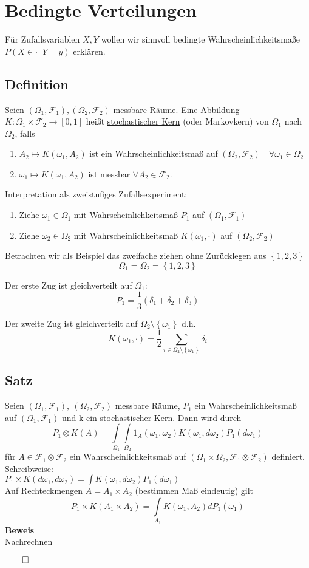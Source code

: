 \documentclass[german,10pt,oneside, fleqn, a4paper]{article}
\newcommand{\ra}{\rightarrow}
\newcommand{\sm}[2][\infty]{\sum\limits_{#2}^{#1}}
\newcommand{\brac}[1]{\left\lbrace #1\right\rbrace}
\newcommand{\QED}{\begin{flushright}$\qed$\end{flushright}}
\newcommand{\mc}[1]{\mathcal{#1}}
\newcommand{\beweis}{\textbf{Beweis}\\}
\newcommand{\1}[1]{1_{#1}}
\newcommand{\2}[1]{\1{\brac{#1}}}
\newcommand{\f}{\mc{F}}
\newcommand{\qf}{\quad\forall}
\begin{document}
\pagebreak
\section{Bedingte Verteilungen}
Für Zufallsvariablen $X,Y$ wollen wir sinnvoll bedingte Wahrscheinlichkeitsmaße $P(X\in\cdot\;|Y=y)$ erklären.

\subsection{Definition}
\label{7.1}
Seien $(\Omega_1,\f_1),(\Omega_2,\f_2)$ messbare Räume. Eine Abbildung\\
$K:\Omega_1\times\f_2\ra [0,1]$ heißt \underline{stochastischer Kern} (oder Markovkern) von $\Omega_1$ nach $\Omega_2$, falls\begin{enumerate}[label=(\roman*)]
\item $A_2\mapsto K(\omega_1,A_2)$ ist ein Wahrscheinlichkeitsmaß auf $(\Omega_2,\f_2)\qf\omega_1\in\Omega_2$
\item $\omega_1\mapsto K(\omega_1,A_2)$ ist messbar $\forall A_2\in\f_2$.
\end{enumerate}
Interpretation als zweistufiges Zufallsexperiment:\begin{enumerate}
\item Ziehe $\omega_1\in\Omega_1$ mit Wahrscheinlichkeitsmaß $P_1$ auf $(\Omega_1,\f_1)$
\item Ziehe $\omega_2\in\Omega_2$ mit Wahrscheinlichkeitsmaß $K(\omega_1,\cdot)$ auf $(\Omega_2,\f_2)$
\end{enumerate}
Betrachten wir als Beispiel das zweifache ziehen ohne Zurücklegen aus $\brac{1,2,3}$\[
 \Omega_1=\Omega_2=\brac{1,2,3}\]\begin{list}{•}{}
 \item Der erste Zug ist gleichverteilt auf $\Omega_1$:\[
 P_1=\dfrac{1}{3}(\delta_1+\delta_2+\delta_3)\]
 \item Der zweite Zug ist gleichverteilt auf $\Omega_2\setminus\brac{\omega_1}$ d.h.\[
K(\omega_1,\cdot)=\dfrac{1}{2}\sm[]{i\in\Omega_2\setminus\brac{\omega_1}}\delta_i\]
 \end{list}
 
 \subsection{Satz}
 \label{7.2}
 Seien $(\Omega_1,\f_1),\ (\Omega_2,\f_2)$ messbare Räume, $P_1$ ein Wahrscheinlichkeitsmaß auf $(\Omega_1,\f_1)$ und k ein stochastischer Kern. Dann wird durch\[
P_1\otimes K(A)=\int\limits_{\Omega_1}\int\limits_{\Omega_2}1_A(\omega_1,\omega_2)K(\omega_1,d\omega_2)P_1(d\omega_1) 
 \]
 für $A\in\f_1\otimes\f_2$ ein Wahrscheinlichkeitsmaß auf $(\Omega_1\times\Omega_2,\f_1\otimes\f_2)$ definiert.\\
 Schreibweise:\\
 $P_1\times K(d\omega_1,d\omega_2)=\int K(\omega_1,d\omega_2)P_1(d\omega_1)$\\
 Auf Rechteckmengen $A=A_1\times A_2$ (bestimmen Maß eindeutig) gilt \[
P_1\times K(A_1\times A_2)=\int\limits_{A_1}K(\omega_1,A_2)dP_1(\omega_1)
 \]
 \beweis
 Nachrechnen\QED
\end{document}
